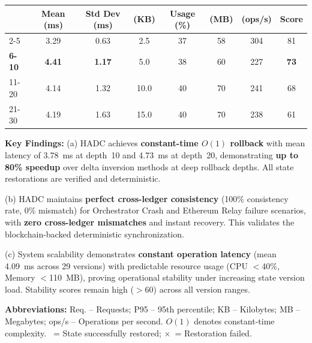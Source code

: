 \begin{table}[htbp]
\begin{tabular}{@{}lccccccc@{}}
 & \textbf{Mean (ms)} & \textbf{Std Dev (ms)} & \textbf{(KB)} & \textbf{Usage (\%)} & \textbf{(MB)} & \textbf{(ops/s)} & \textbf{Score} \\
\midrule
2-5 & 3.29 & 0.63 & 2.5 & 37 & 58 & 304 & 81 \\
\textbf{6-10} & \textbf{4.41} & \textbf{1.17} & 5.0 & 38 & 60 & 227 & \textbf{73} \\
11-20 & 4.14 & 1.32 & 10.0 & 40 & 70 & 241 & 68 \\
21-30 & 4.19 & 1.63 & 15.0 & 40 & 70 & 238 & 61 \\
\bottomrule
\end{tabular}
\vspace{4pt}

\footnotesize{
\textbf{Key Findings:} 
(a) HADC achieves \textbf{constant-time $O(1)$ rollback} with mean latency of 3.78~ms at depth~10 and 4.73~ms at depth~20, demonstrating \textbf{up to 80\% speedup} over delta inversion methods at deep rollback depths. All state restorations are verified and deterministic.

(b) HADC maintains \textbf{perfect cross-ledger consistency} (100\% consistency rate, 0\% mismatch) for Orchestrator Crash and Ethereum Relay failure scenarios, with \textbf{zero cross-ledger mismatches} and instant recovery. This validates the blockchain-backed deterministic synchronization.

(c) System scalability demonstrates \textbf{constant operation latency} (mean 4.09~ms across 29 versions) with predictable resource usage (CPU $<$40\%, Memory $<$110~MB), proving operational stability under increasing state version load. Stability scores remain high ($>$60) across all version ranges.

\textbf{Abbreviations:} Req. -- Requests; P95 -- 95th percentile; KB -- Kilobytes; MB -- Megabytes; ops/s -- Operations per second.
$O(1)$ denotes constant-time complexity. \checkmark~= State successfully restored; $\times$~= Restoration failed.
}
\vspace{-0.5em}
\end{table}
